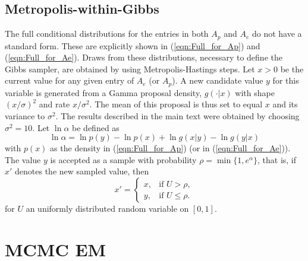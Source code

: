 \documentclass[11pt]{amsart}
\theoremstyle{definition}
\begin{document}
\subsection{Metropolis-within-Gibbs}\label{sec:MHsteps} 
The full conditional distributions for the entries in both $A_p$ and
$A_e$ do not have a standard form. These are explicitly shown in
(\ref{eqn:Full_for_Ap}) and (\ref{eqn:Full_for_Ae}). Draws from these
distributions, necessary to define the Gibbs sampler,  are obtained by
using Metropolis-Hastings steps.  Let $x > 0$ be the current value
for any given entry of $A_e$ (or $A_p$). A new candidate value $y$ for
this variable is generated from a Gamma proposal density, $g(\cdot|
x)$ with shape $(x/\sigma)^2$ and rate $x/\sigma^2$. The mean of this
proposal is thus set to equal $x$ and its variance to $\sigma^2$. The
results described in the main text were obtained by choosing
$\sigma^2 = 10$. Let $\ln \alpha$ be defined as
\[
  \ln \alpha 
 =
  \ln p(y) - \ln p(x) + \ln g(x|y) - \ln g(y|x)
\]
with $p(x)$ as the density in (\ref{eqn:Full_for_Ap}) (or in  
(\ref{eqn:Full_for_Ae})). The value $y$ is accepted as a sample
with probability $\rho = \min\{1, e^{\alpha}\}$, that is, if $x'$
denotes the new sampled value, then
\[
   x'
    =
  \begin{cases}
    x, & \text{if } U > \rho,\\
    y, & \text{if } U \leq \rho.
  \end{cases}
\]
for $U$ an uniformly distributed random variable on $[0, 1]$.

\section{MCMC EM}
\end{document}
